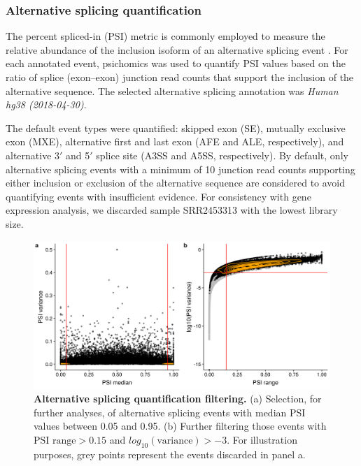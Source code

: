 \subsubsection{Alternative splicing quantification}

The percent spliced-in (PSI) metric is commonly employed to measure the relative abundance of the inclusion isoform of an alternative splicing event \cite{wang:2008wa}. For each annotated event, psichomics was used to quantify PSI values based on the ratio of splice (exon–exon) junction read counts that support the inclusion of the alternative sequence. The selected alternative splicing annotation was \emph{Human hg38 (2018-04-30)}.

The default event types were quantified: skipped exon (SE), mutually exclusive exon (MXE), alternative first and last exon (AFE and ALE, respectively), and alternative 3$'$ and 5$'$ splice site (A3SS and A5SS, respectively). By default, only alternative splicing events with a minimum of 10 junction read counts supporting either inclusion or exclusion of the alternative sequence are considered to avoid quantifying events with insufficient evidence. For consistency with gene expression analysis, we discarded sample SRR2453313 with the lowest library size.

\begin{figure}
  \includegraphics[width=\linewidth]{images/psichomics/4-psi-filtering}
  \caption[Alternative splicing quantification filtering]{\textbf{Alternative splicing quantification filtering.} (a) Selection, for further analyses, of alternative splicing events with median PSI values between 0.05 and 0.95. (b) Further filtering those events with $\textrm{PSI range} > 0.15$ and $log_{10}(\textrm{variance}) > -3$. For illustration purposes, grey points represent the events discarded in panel a.}
  \label{fig:psichomics-psi-filtering}
\end{figure}


